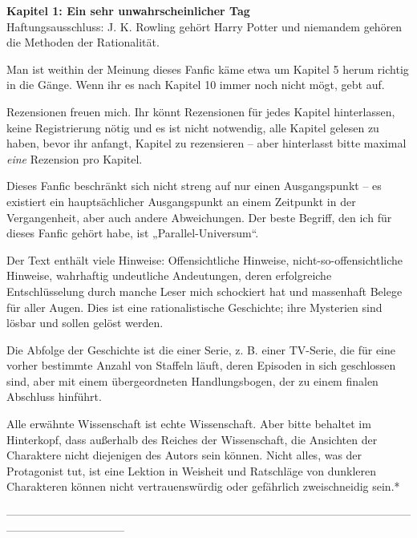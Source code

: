 

\hypertarget{ein-sehr-unwahrscheinlicher-tag}{%

\textbf{Kapitel 1: Ein sehr unwahrscheinlicher Tag}\\

\hfill\break Haftungsausschluss: J. K. Rowling gehört Harry Potter und niemandem gehören die Methoden der Rationalität.

Man ist weithin der Meinung dieses Fanfic käme etwa um Kapitel 5 herum richtig in die Gänge. Wenn ihr es nach Kapitel 10 immer noch nicht mögt, gebt auf.

Rezensionen freuen mich. Ihr könnt Rezensionen für jedes Kapitel hinterlassen, keine Registrierung nötig und es ist nicht notwendig, alle Kapitel gelesen zu haben, bevor ihr anfangt, Kapitel zu rezensieren -- aber hinterlasst bitte maximal \emph{eine} Rezension pro Kapitel.

Dieses Fanfic beschränkt sich nicht streng auf nur einen Ausgangspunkt -- es existiert ein hauptsächlicher Ausgangspunkt an einem Zeitpunkt in der Vergangenheit, aber auch andere Abweichungen. Der beste Begriff, den ich für dieses Fanfic gehört habe, ist „Parallel-Universum“.

Der Text enthält viele Hinweise: Offensichtliche Hinweise, nicht-so-offensichtliche Hinweise, wahrhaftig undeutliche Andeutungen, deren erfolgreiche Entschlüsselung durch manche Leser mich schockiert hat und massenhaft Belege für aller Augen. Dies ist eine rationalistische Geschichte; ihre Mysterien sind lösbar und sollen gelöst werden.

Die Abfolge der Geschichte ist die einer Serie, z. B. einer TV-Serie, die für eine vorher bestimmte Anzahl von Staffeln läuft, deren Episoden in sich geschlossen sind, aber mit einem übergeordneten Handlungsbogen, der zu einem finalen Abschluss hinführt.

Alle erwähnte Wissenschaft ist echte Wissenschaft. Aber bitte behaltet im Hinterkopf, dass außerhalb des Reiches der Wissenschaft, die Ansichten der Charaktere nicht diejenigen des Autors sein können. Nicht alles, was der Protagonist tut, ist eine Lektion in Weisheit und Ratschläge von dunkleren Charakteren können nicht vertrauenswürdig oder gefährlich zweischneidig sein.*

--------------------------------------------------------------------------------------------------------------------------------------------

}
